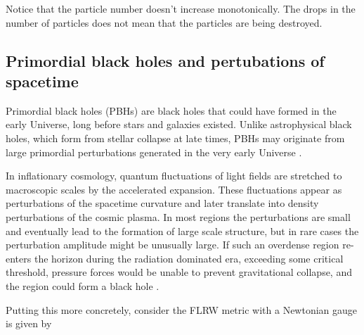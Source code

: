 Notice that the particle number doesn't increase monotonically. The drops in the number of particles does not mean that the particles are being destroyed.


\subsection{Primordial black holes and pertubations of spacetime}
Primordial black holes (PBHs) are black holes that could have formed in the early Universe, long before stars and galaxies existed. Unlike astrophysical black holes, which form from stellar collapse at late times, PBHs may originate from large primordial perturbations generated in the very early Universe \cite{carr1974black}.

In inflationary cosmology, quantum fluctuations of light fields are stretched to macroscopic scales by the accelerated expansion. These fluctuations appear as perturbations of the spacetime curvature and later translate into density perturbations of the cosmic plasma. In most regions the perturbations are small and eventually lead to the formation of large scale structure, but in rare cases the perturbation amplitude might be unusually large. If such an overdense region re-enters the horizon during the radiation dominated era, exceeding some critical threshold, pressure forces would be unable to prevent gravitational collapse, and the region could form a black hole \cite{carr1974black}.

Putting this more concretely, consider the FLRW metric with a Newtonian gauge is given by \cite{karciauskas2025primordial}

